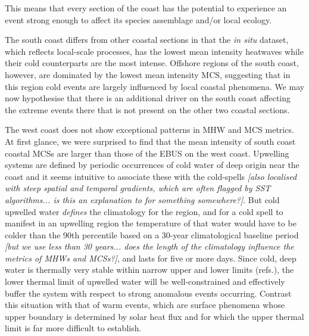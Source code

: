 \documentclass[a4paper,10pt,review]{elsarticle}
\begin{document}
This means that every section of the coast has the potential to experience an event strong enough to affect its species assemblage and/or local ecology.

The south coast differs from other coastal sections in that the \emph{in situ} dataset, which reflects local-scale processes, has the lowest mean intensity heatwaves while their cold counterparts are the most intense. Offshore regions of the south coast, however, are dominated by the lowest mean intensity MCS, suggesting that in this region cold events are largely influenced by local coastal phenomena. We may now hypothesise that there is an additional driver on the south coast affecting the extreme events there that is not present on the other two coastal sections.

The west coast does not show exceptional patterns in MHW and MCS metrics. At first glance, we were surprised to find that the mean intensity of south coast coastal MCSs are larger than those of the EBUS on the west coast. Upwelling systems are defined by periodic occurrences of cold water of deep origin near the coast and it seems intuitive to associate these with the cold-spells \emph{[also localised with steep spatial and temporal gradients, which are often flagged by SST algorithms... is this an explanation to for something somewhere?]}. But cold upwelled water \emph{defines} the climatology for the region, and for a cold spell to manifest in an upwelling region the temperature of that water would have to be colder than the 90th percentile based on a 30-year climatological baseline period \emph{[but we use less than 30 years... does the length of the climatology influence the metrics of MHWs and MCSs?]}, and lasts for five or more days. Since cold, deep water is thermally very stable within narrow upper and lower limits (refs.), the lower thermal limit of upwelled water will be well-constrained and effectively buffer the system with respect to strong anomalous events occurring. Contrast this situation with that of warm events, which are surface phenomena whose upper boundary is determined by solar heat flux and for which the upper thermal limit is far more difficult to establish.
\end{document}

